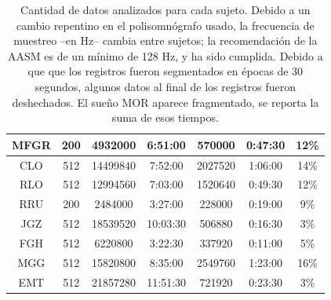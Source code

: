 \begin{table}
\begin{tabular}{c||c|cc|ccc}
MFGR&200       &4932000 &   6:51:00 &570000  &   0:47:30 &12\% \\
\hline
CLO &512       &14499840&   7:52:00 &2027520 &   1:06:00 &14\% \\
RLO &512       &12994560&   7:03:00 &1520640 &   0:49:30 &12\% \\
RRU &200       &2484000 &   3:27:00 &228000  &   0:19:00 & 9\% \\
JGZ &512       &18539520&  10:03:30 &506880  &   0:16:30 & 3\% \\
\hline
FGH &512       &6220800 &   3:22:30 &337920  &   0:11:00 & 5\% \\
MGG &512       &15820800&   8:35:00 &2549760 &   1:23:00 &16\% \\
EMT &512       &21857280&  11:51:30 &721920  &   0:23:30 & 3\%
\end{tabular}
\caption{Cantidad de datos analizados para cada sujeto. Debido a un cambio repentino en el
polisomn\'ografo usado, la frecuencia de muestreo --en Hz-- cambia entre sujetos; la recomendaci\'on 
de la AASM es de un m\'inimo de 128 Hz, y ha sido cumplida.
Debido a que que los registros fueron segmentados en \'epocas de 30 segundos,
algunos datos al final de los registros fueron deshechados. 
El sue\~no MOR aparece fragmentado, se reporta la suma de esos tiempos.}
\label{frecuencias}
\end{table}

